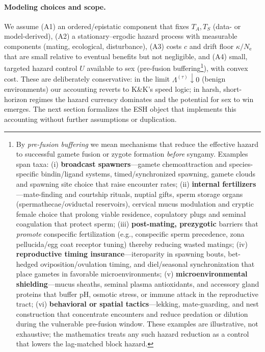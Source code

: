 \documentclass[11pt]{article}
\theoremstyle{upright}
\newcommand{\Ne}{N_{\mathrm{e}}}
\begin{document}
\paragraph{Modeling choices and scope.}
We assume (A1) an ordered/epistatic component that fixes $T_A,T_S$ (data- or model-derived), (A2) a stationary–ergodic hazard process with measurable components (mating, ecological, disturbance), (A3) costs $c$ and drift floor $\kappa/\Ne$ that are small relative to eventual benefits but not negligible, and (A4) small, targeted hazard control $U$ available to sex (pre-fusion buffering\footnote{By \emph{pre-fusion buffering} we mean mechanisms that reduce the effective hazard to successful gamete fusion or zygote formation \emph{before} syngamy. Examples span taxa: (i) \textbf{broadcast spawners}—gamete chemoattraction and species-specific bindin/ligand systems, timed/synchronized spawning, gamete clouds and spawning site choice that raise encounter rates; (ii) \textbf{internal fertilizers}—mate-finding and courtship rituals, nuptial gifts, sperm storage organs (spermathecae/oviductal reservoirs), cervical mucus modulation and cryptic female choice that prolong viable residence, copulatory plugs and seminal coagulation that protect sperm; (iii) \textbf{post-mating, prezygotic} barriers that \emph{promote} conspecific fertilization (e.g., conspecific sperm precedence, zona pellucida/egg coat receptor tuning) thereby reducing wasted matings; (iv) \textbf{reproductive timing insurance}—iteroparity in spawning bouts, bet-hedged oviposition/ovulation timing, and diel/seasonal synchronization that place gametes in favorable microenvironments; (v) \textbf{microenvironmental shielding}—mucus sheaths, seminal plasma antioxidants, and accessory gland proteins that buffer pH, osmotic stress, or immune attack in the reproductive tract; (vi) \textbf{behavioral or spatial tactics}—lekking, mate-guarding, and nest construction that concentrate encounters and reduce predation or dilution during the vulnerable pre-fusion window. These examples are illustrative, not exhaustive; the mathematics treats any such hazard reduction as a control that lowers the lag-matched block hazard.}), with convex cost. These are deliberately conservative: in the limit $\Lambda^{(\tau)}\downarrow 0$ (benign environments) our accounting reverts to K\&K’s speed logic; in harsh, short-horizon regimes the hazard currency dominates and the potential for sex to win emerges. The next section formalizes the ESH object that implements this accounting without further assumptions or duplication.
\end{document}
